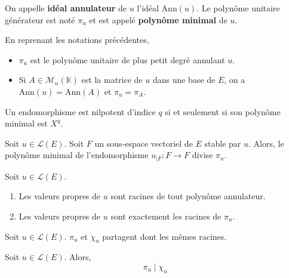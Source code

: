   \begin{definition}
    On appelle \textbf{idéal annulateur} de $u$ l'idéal $\mathrm{Ann}(u)$. Le polynôme unitaire générateur est noté $\pi_u$ et est appelé \textbf{polynôme minimal} de $u$.
  \end{definition}

  \begin{remark}
    En reprenant les notations précédentes,
    \begin{itemize}
      \item $\pi_u$ est le polynôme unitaire de plus petit degré annulant $u$.
      \item Si $A \in \mathcal{M}_n(\mathbb{K})$ est la matrice de $u$ dans une base de $E$, on a $\mathrm{Ann}(u) = \mathrm{Ann}(A)$ et $\pi_u = \pi_A$.
    \end{itemize}
  \end{remark}

  \begin{example}
    Un endomorphisme est nilpotent d'indice $q$ si et seulement si son polynôme minimal est $X^q$.
  \end{example}

  \begin{proposition}
    Soit $u \in \mathcal{L}(E)$. Soit $F$ un sous-espace vectoriel de $E$ stable par $u$. Alors, le polynôme minimal de l'endomorphisme $u_{|F} : F \rightarrow F$ divise $\pi_u$.
  \end{proposition}

  \begin{proposition}
    Soit $u \in \mathcal{L}(E)$.
    \begin{enumerate}[label={\bfseries(\roman*)}]
      \item Les valeurs propres de $u$ sont racines de tout polynôme annulateur.
      \item Les valeurs propres de $u$ sont exactement les racines de $\pi_u$.
    \end{enumerate}
  \end{proposition}


  \begin{remark}
    Soit $u \in \mathcal{L}(E)$. $\pi_u$ et $\chi_u$ partagent dont les mêmes racines.
  \end{remark}


  \begin{theorem}
    Soit $u \in \mathcal{L}(E)$. Alors,
    \[ \pi_u \mid \chi_u \]
  \end{theorem}

